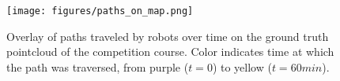 \documentclass{article}
\newcommand{\ph}[1]{{\textbf{#1}:}} %
\newcommand{\argmax}{\mathop{\mathrm{argmax}}}
\begin{document}
\begin{figure}[ht!]
  \texttt{[image: figures/paths\_on\_map.png]}
  \centering
  \caption{Overlay of paths traveled by robots over time on the ground truth pointcloud of the competition course.  Color indicates time at which the path was traversed, from purple ($t=0$) to yellow ($t=60min$).}
  \label{fig:paths_on_map}
\end{figure}











\end{document}
